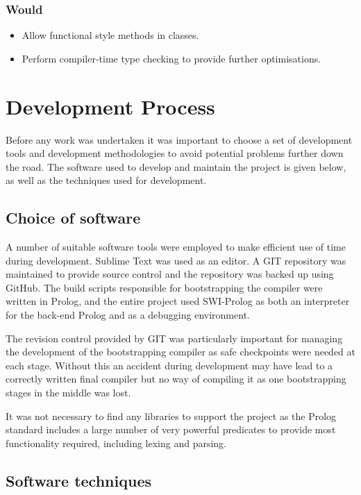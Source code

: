 \documentclass[12pt,a4paper,twoside,openright]{report}
\begin{document}
\subsubsection{Would}
\begin{itemize}
	\item Allow functional style methods in classes.
	\item Perform compiler-time type checking to provide further optimisations.
\end{itemize}

\section{Development Process}

Before any work was undertaken it was important to choose a set of development tools and development methodologies to avoid potential problems further down the road. The software used to develop and maintain the project is given below, as well as the techniques used for development.

\subsection{Choice of software}

A number of suitable software tools were employed to make efficient use of time during development. Sublime Text was used as an editor. A GIT repository was maintained to provide source control and the repository was backed up using GitHub. The build scripts responsible for bootstrapping the compiler were written in Prolog, and the entire project used SWI-Prolog as both an interpreter for the back-end Prolog and as a debugging environment.

\bigskip

The revision control provided by GIT was particularly important for managing the development of the bootstrapping compiler as safe checkpoints were needed at each stage. Without this an accident during development may have lead to a correctly written final compiler but no way of compiling it as one bootstrapping stages in the middle was lost.

\bigskip

It was not necessary to find any libraries to support the project as the Prolog standard includes a large number of very powerful predicates to provide most functionality required, including lexing and parsing.

\subsection{Software techniques}
\end{document}
